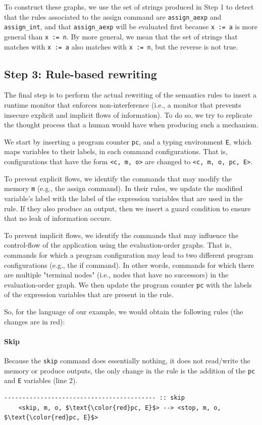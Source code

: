 \documentclass[conference]{IEEEtran}
\begin{document}
To construct these graphs, we use the set of strings produced in Step 1 to detect that the rules associated to the assign command are \lstinline{assign_aexp} and \lstinline{assign_int}, and that \lstinline{assign_aexp} will be evaluated first because \lstinline{x := a} is more general than \lstinline{x := n}. By more general, we mean that the set of strings that matches with \lstinline{x := a} also matches with \lstinline{x := n}, but the reverse is not true.

\subsection{Step 3: Rule-based rewriting}
The final step is to perform the actual rewriting of the semantics rules to insert a runtime monitor that enforces non-interference (i.e., a monitor that prevents insecure explicit and implicit flows of information). To do so, we try to replicate the thought process that a human would have when producing such a mechanism.

We start by inserting a program counter \lstinline{pc}, and a typing environment \lstinline{E}, which maps variables to their labels, in each command configurations. That is, configurations that have the form \lstinline{<c, m, o>} are changed to \lstinline{<c, m, o, pc, E>}.

To prevent explicit flows, we identify the commands that may modify the memory \lstinline{m} (e.g., the assign command). In their rules, we update the modified variable's label with the label of the expression variables that are used in the rule. If they also produce an output, then we insert a guard condition to ensure that no leak of information occurs.

To prevent implicit flows, we identify the commands that may influence the control-flow of the application using the evaluation-order graphs. That is, commands for which a program configuration may lead to two different program configurations (e.g., the if command). In other words, commands for which there are multiple "terminal nodes" (i.e., nodes that have no successors) in the evaluation-order graph. We then update the program counter \lstinline{pc} with the labels of the expression variables that are present in the rule.

So, for the language of our example, we would obtain the following rules (the changes are in {\color{red}red}):

\paragraph{Skip}
Because the \lstinline{skip} command does essentially nothing, it does not read/write the memory or produce outputs, the only change in the rule is the addition of the \lstinline{pc} and \lstinline{E} variables (line 2).
\begin{lstlisting}[label=listing:output-semantics-skip,numbers=right,captionpos=b,caption=Ott-IFC's output for the "skip" command]
	------------------------------------------ :: skip
	<skip, m, o, $\text{\color{red}pc, E}$> --> <stop, m, o, $\text{\color{red}pc, E}$>
\end{lstlisting}
\end{document}
